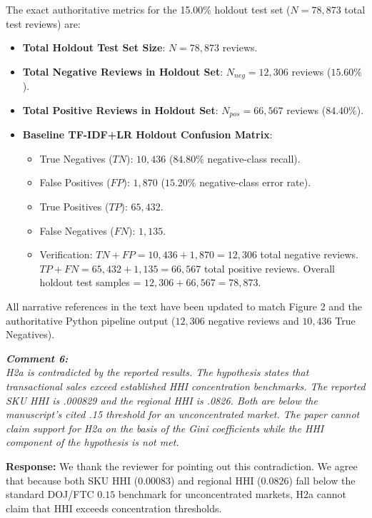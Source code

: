 \documentclass[11pt]{article}
\newcommand{\comment}[1]{\vspace{12pt}\noindent\colorbox{gray!10}{\parbox{\dimexpr\textwidth-2\fboxsep\relax}{\color{commentcolor}\itshape #1}}\vspace{6pt}}
\newcommand{\response}{\vspace{6pt}\noindent\textbf{Response: }}
\begin{document}
The exact authoritative metrics for the 15.00\% holdout test set ($N = 78,873$ total test reviews) are:
\begin{itemize}
    \item \textbf{Total Holdout Test Set Size}: $N = 78,873$ reviews.
    \item \textbf{Total Negative Reviews in Holdout Set}: $N_{neg} = 12,306$ reviews ($15.60\%$).
    \item \textbf{Total Positive Reviews in Holdout Set}: $N_{pos} = 66,567$ reviews ($84.40\%$).
    \item \textbf{Baseline TF-IDF+LR Holdout Confusion Matrix}:
    \begin{itemize}
        \item True Negatives ($TN$): $10,436$ ($84.80\%$ negative-class recall).
        \item False Positives ($FP$): $1,870$ ($15.20\%$ negative-class error rate).
        \item True Positives ($TP$): $65,432$.
        \item False Negatives ($FN$): $1,135$.
        \item Verification: $TN + FP = 10,436 + 1,870 = 12,306$ total negative reviews. $TP + FN = 65,432 + 1,135 = 66,567$ total positive reviews. Overall holdout test samples = $12,306 + 66,567 = 78,873$.
    \end{itemize}
\end{itemize}

All narrative references in the text have been updated to match Figure 2 and the authoritative Python pipeline output ($12,306$ negative reviews and $10,436$ True Negatives).

\comment{\textbf{Comment 6:} \\
H2a is contradicted by the reported results. The hypothesis states that transactional sales exceed established HHI concentration benchmarks. The reported SKU HHI is .000829 and the regional HHI is .0826. Both are below the manuscript's cited .15 threshold for an unconcentrated market. The paper cannot claim support for H2a on the basis of the Gini coefficients while the HHI component of the hypothesis is not met.}

\response
We thank the reviewer for pointing out this contradiction. We agree that because both SKU HHI ($0.00083$) and regional HHI ($0.0826$) fall below the standard DOJ/FTC $0.15$ benchmark for unconcentrated markets, H2a cannot claim that HHI exceeds concentration thresholds.
\end{document}
